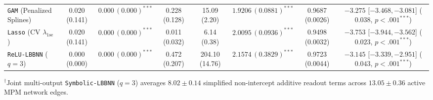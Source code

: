 \documentclass[11pt,a4paper]{article}
\begin{document}
\begin{table}[t!]
{\begin{tabular}{lccccccc}
\texttt{GAM} (Penalized Splines) & 0.020 (0.141) & $0.000\,(0.000)^{***}$ & 0.228 (0.128) & 15.09 (2.20) & $1.9206\,(0.0881)^{***}$ & 0.9687 (0.0026) & $-3.275$ [$-3.468, -3.081$] ($0.038$, $p < .001^{***}$) \\
\texttt{Lasso} (CV $\lambda_{\text{1se}}$) & 0.020 (0.141) & $0.000\,(0.000)^{***}$ & 0.011 (0.032) & 6.14 (0.38) & $2.0095\,(0.0936)^{***}$ & 0.9498 (0.0032) & $-3.753$ [$-3.944, -3.562$] ($0.023$, $p < .001^{***}$) \\
\texttt{ReLU-LBBNN} ($q=3$) & 0.000 (0.000) & $0.000\,(0.000)^{***}$ & 0.472 (0.207) & 204.10 (14.76) & $2.1574\,(0.3829)^{***}$ & 0.9723 (0.0044) & $-3.145$ [$-3.339, -2.951$] ($0.043$, $p < .001^{***}$) \\
\bottomrule
\end{tabular}%
}
\vspace{2pt}
\parbox{\textwidth}{\scriptsize $^{\dagger}$Joint multi-output \texttt{Symbolic-LBBNN} ($q = 3$) averages $8.02 \pm 0.14$ simplified non-intercept additive readout terms across $13.05 \pm 0.36$ active MPM network edges.}
\end{table}
\end{document}
